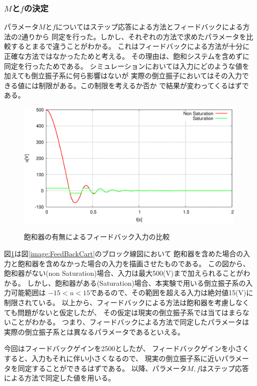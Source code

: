 	\subsubsection{$M$と$f$の決定}
	パラメータ$M$と$f$についてはステップ応答による方法とフィードバックによる方法の2通りから
	同定を行った。しかし、それぞれの方法で求めたパラメータを比較するとまるで違うことがわかる。
	これはフィードバックによる方法が十分に正確な方法ではなかったためと考える。
	その理由は、飽和システムを含めずに同定を行ったためである。
	シミュレーションにおいては入力にどのような値を加えても倒立振子系に何ら影響はないが
	実際の倒立振子においてはその入力できる値には制限がある。この制限を考えるか否か
	で結果が変わってくるはずである。
	\begin{figure}[H]
		\centering
		\includegraphics[width=0.8\linewidth]{gazo/feedback_input.eps}\\
		\caption{飽和器の有無によるフィードバック入力の比較}
		\label{image:feedback_saturation}
	\end{figure}
	図\ref{image:feedback_saturation}は図\ref{image:FeedBackCart}のブロック線図において
	飽和器を含めた場合の入力と飽和器を含めなかった場合の入力を描画させたものである。
	この図から、飽和器がない(non Saturation)場合、入力は最大500(V)まで加えられることがわかる。
	しかし、飽和器がある(Saturation)場合、本実験で用いる倒立振子系の入力可能範囲は
	$-15<u<15$であるので、その範囲を超える入力は絶対値15(V)に制限されている。
	以上から、フィードバックによる方法は飽和器を考慮しなくても問題がないと仮定したが、
	その仮定は現実の倒立振子系では当てはまらないことがわかる。
	つまり、フィードバックによる方法で同定したパラメータは実際の倒立振子系とは異なるパラメータであるといえる。
	\par
	今回はフィードバックゲインを2500としたが、
	フィードバックゲインを小さくすると、入力もそれに伴い小さくなるので、
	現実の倒立振子系に近いパラメータを同定することができるはずである。
	以降、パラメータ$M,f$はステップ応答による方法で同定した値を用いる。
	
